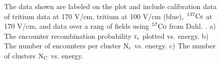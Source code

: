 \renewcommand{\baselinestretch}{1}
\small\normalsize
\begin{figure}[h!]\centering
{}

\bigskip

\hfill
{}
\caption{The data shown are labeled on the plot and include calibration data of tritium data at 170 V/cm, tritium at 100 V/cm (blue), $\rm ^{137}Cs$ at 170 V/cm, and data over a rang of fields using $\rm ^{57}Co$ from Dahl. \cite{Dahl_Thesis}. a) The encounter recombination probability $\rm r_\epsilon$ plotted vs. energy. b) The number of encounters per cluster $\rm N_\epsilon$ vs. energy. c) The number of clusters $\rm N_C$ vs. energy.}
\label{fig:Simple_re}
\end{figure}
\renewcommand{\baselinestretch}{2}
\small\normalsize

